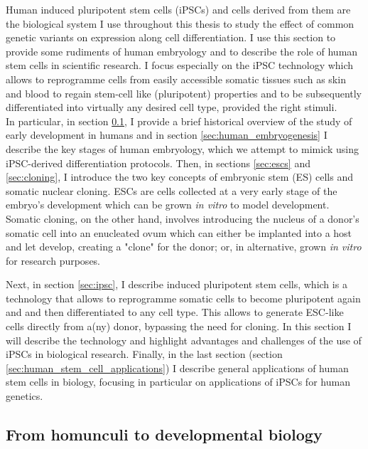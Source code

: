 Human induced pluripotent stem cells (iPSCs) and cells derived from them are the biological system I use throughout this thesis to study the effect of common genetic variants on expression along cell differentiation.
I use this section to provide some rudiments of human embryology and to describe the role of human stem cells in scientific research.
I focus especially on the iPSC technology which allows to reprogramme cells from easily accessible somatic tissues such as skin and blood to regain stem-cell like (pluripotent) properties and to be subsequently differentiated into virtually any desired cell type, provided the right stimuli.\\

In particular, in section \ref{sec:history_developmental_biology}, I provide a brief historical overview of the study of early development in humans and in section \ref{sec:human_embryogenesis} I describe the key stages of human embryology, which we attempt to mimick using iPSC-derived differentiation protocols.
Then, in sections \ref{sec:escs} and \ref{sec:cloning}, I introduce the two key concepts of embryonic stem (ES) cells and somatic nuclear cloning.
ESCs are cells collected at a very early stage of the embryo's development which can be grown \textit{in vitro} to model development.
Somatic cloning, on the other hand, involves introducing the nucleus of a donor's somatic cell into an enucleated ovum which can either be implanted into a host and let develop, creating a "clone" for the donor; or, in alternative, grown \textit{in vitro} for research purposes.
 
Next, in section \ref{sec:ipsc}, I describe induced pluripotent stem cells, which is a technology that allows to reprogramme somatic cells to become pluripotent again and and then differentiated to any cell type. 
This allows to generate ESC-like cells directly from a(ny) donor, bypassing the need for cloning. 
In this section I will describe the technology and highlight advantages and challenges of the use of iPSCs in biological research.
Finally, in the last section (section \ref{sec:human_stem_cell_applications}) I describe general applications of human stem cells in biology, focusing in particular on applications of iPSCs for human genetics.

\newpage

\subsection{From homunculi to developmental biology}
\label{sec:history_developmental_biology}

